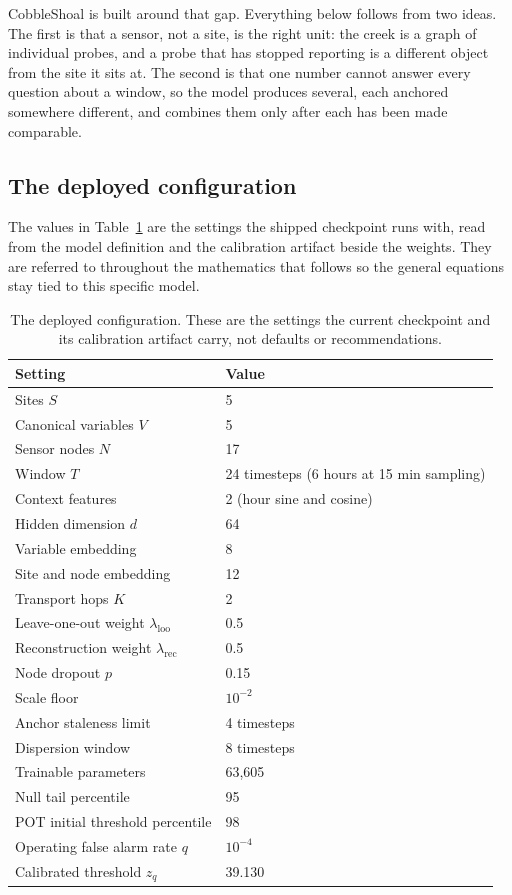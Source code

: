 \documentclass{article}
\begin{document}
CobbleShoal is built around that gap. Everything below follows from two ideas.
The first is that a sensor, not a site, is the right unit: the creek is a graph
of individual probes, and a probe that has stopped reporting is a different
object from the site it sits at. The second is that one number cannot answer
every question about a window, so the model produces several, each anchored
somewhere different, and combines them only after each has been made
comparable.

\subsection{The deployed configuration}
\label{sec:configuration}

The values in Table~\ref{tab:config} are the settings the shipped checkpoint
runs with, read from the model definition and the calibration artifact beside
the weights. They are referred to throughout the mathematics that follows so
the general equations stay tied to this specific model.

\begin{table}[t]
  \centering
  \caption{The deployed configuration. These are the settings the current
    checkpoint and its calibration artifact carry, not defaults or
    recommendations.}
  \label{tab:config}
  \begin{tabular}{ll}
    \toprule
    Setting & Value \\
    \midrule
    Sites $S$ & 5 \\
    Canonical variables $V$ & 5 \\
    Sensor nodes $N$ & 17 \\
    Window $T$ & 24 timesteps (6 hours at 15 min sampling) \\
    Context features & 2 (hour sine and cosine) \\
    Hidden dimension $d$ & 64 \\
    Variable embedding & 8 \\
    Site and node embedding & 12 \\
    Transport hops $K$ & 2 \\
    Leave-one-out weight $\lambda_{\mathrm{loo}}$ & 0.5 \\
    Reconstruction weight $\lambda_{\mathrm{rec}}$ & 0.5 \\
    Node dropout $p$ & 0.15 \\
    Scale floor & $10^{-2}$ \\
    Anchor staleness limit & 4 timesteps \\
    Dispersion window & 8 timesteps \\
    Trainable parameters & 63{,}605 \\
    Null tail percentile & 95 \\
    POT initial threshold percentile & 98 \\
    Operating false alarm rate $q$ & $10^{-4}$ \\
    Calibrated threshold $z_q$ & 39.130 \\
    \bottomrule
  \end{tabular}
\end{table}
\end{document}
